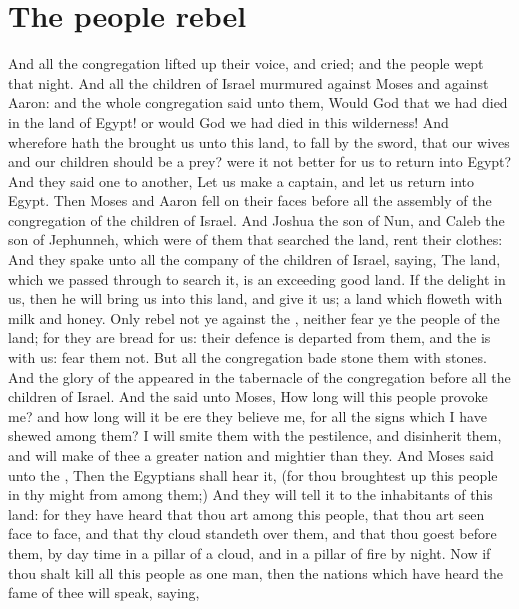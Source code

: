 \section*{The people rebel}
\begin{biblechapter} %
\verse And all the congregation lifted up their voice, and cried; and the people wept that night.
\verse And all the children of Israel murmured against Moses and against Aaron: and the whole congregation said unto them, Would God that we had died in the land of Egypt! or would God we had died in this wilderness!
\verse And wherefore hath the \LORD brought us unto this land, to fall by the sword, that our wives and our children should be a prey? were it not better for us to return into Egypt?
\verse And they said one to another, Let us make a captain, and let us return into Egypt.
\verse Then Moses and Aaron fell on their faces before all the assembly of the congregation of the children of Israel.
\verse And Joshua the son of Nun, and Caleb the son of Jephunneh, which were of them that searched the land, rent their clothes:
\verse And they spake unto all the company of the children of Israel, saying, The land, which we passed through to search it, is an exceeding good land.
\verse If the \LORD delight in us, then he will bring us into this land, and give it us; a land which floweth with milk and honey.
\verse Only rebel not ye against the \LORD, neither fear ye the people of the land; for they are bread for us: their defence is departed from them, and the \LORD is with us: fear them not.
\verse But all the congregation bade stone them with stones. And the glory of the \LORD appeared in the tabernacle of the congregation before all the children of Israel.
\verse And the \LORD said unto Moses, How long will this people provoke me? and how long will it be ere they believe me, for all the signs which I have shewed among them?
\verse I will smite them with the pestilence, and disinherit them, and will make of thee a greater nation and mightier than they.
\verse And Moses said unto the \LORD, Then the Egyptians shall hear it, (for thou broughtest up this people in thy might from among them;)
\verse And they will tell it to the inhabitants of this land: for they have heard that thou \LORD art among this people, that thou \LORD art seen face to face, and that thy cloud standeth over them, and that thou goest before them, by day time in a pillar of a cloud, and in a pillar of fire by night.
\verse Now if thou shalt kill all this people as one man, then the nations which have heard the fame of thee will speak, saying,

\end{biblechapter}
